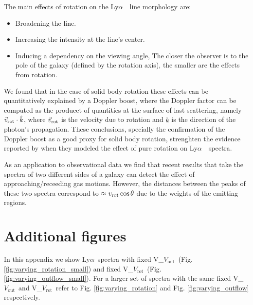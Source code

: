 \documentclass[a4paper,fleqn,usenatbib]{mnras}
\newcommand{\lya}{\ifmmode{{\rm Ly}\alpha}\else Ly$\alpha$\ \fi}
\newcommand{\vrot}{\ifmmode\mathrm V_{\mathrm{rot}}\else $V_{\mathrm{rot}}$~\fi}
\newcommand{\vout}{\ifmmode\mathrm V_{\mathrm{out}}\else $V_{\mathrm{out}}$~\fi}
\begin{document}
The main effects of rotation on the \lya\ line morphology are:


\begin{itemize}
  \item Broadening the line.
	\item Increasing the intensity at the line's center.
	\item Inducing a dependency on the viewing angle,
  The closer the observer is to the pole of the galaxy (defined by the rotation axis),
  the smaller are the effects from rotation.
\end{itemize}

We found that in the case of solid body rotation these effects can be quantitatively
explained by a Doppler boost, where the Doppler factor can be computed as the
 producet of quantities at the surface of last scattering, namely $\vec{v}_{\rm rot}\cdot \hat{k}$,
 where $\vec{v}_{\rm rot}$ is the velocity due to rotation and $\hat{k}$ is the direction
of the photon's propagation.
These conclusions, specially the confirmation of the Doppler boost as
a good proxy for solid body rotation, strenghten the evidence reported
by \cite{Garavito14} when they modeled the effect of pure rotation on
\lya\ spectra.  

As an application to observational data we find that recent results
that take the spectra of two different sides of a galaxy can detect 
the effect of approaching/receeding gas motions. 
However, the distances between the peaks of these two spectra 
correspond to $\approx v_{\rm rot} \cos\theta$ due to the weights of the
emitting regions.








\appendix

\section{Additional figures}
\label{sec:appendix}

In this appendix we show \lya spectra with fixed \vout (Fig. \ref{fig:varying_rotation_small})
and fixed \vrot (Fig. \ref{fig:varying_outflow_small}). For a larger set of spectra with the
same fixed \vout and \vrot refer to Fig. \ref{fig:varying_rotation} and Fig. \ref{fig:varying_outflow}
respectively.
\end{document}
